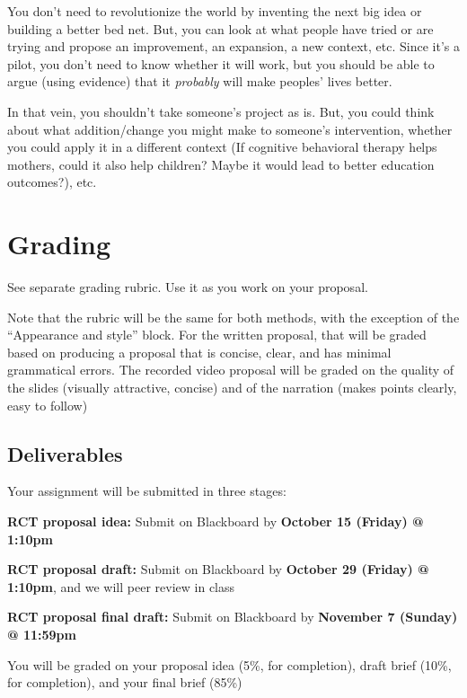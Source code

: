 \documentclass[11pt]{article}
\begin{document}
You don't need to revolutionize the world by inventing the next big idea
or building a better bed net. But, you can look at what people have
tried or are trying and propose an improvement, an expansion, a new
context, etc. Since it's a pilot, you don't need to know whether it will
work, but you should be able to argue (using evidence) that it
\emph{probably} will make peoples' lives better.

In that vein, you shouldn't take someone's project as is. But, you could
think about what addition/change you might make to someone's
intervention, whether you could apply it in a different context (If
cognitive behavioral therapy helps mothers, could it also help children?
Maybe it would lead to better education outcomes?), etc.

\hypertarget{grading-2}{%
\section*{Grading}\label{grading-2}}

See separate grading rubric. Use it as you work on your proposal.

Note that the rubric will be the same for both methods, with the
exception of the ``Appearance and style'' block. For the written
proposal, that will be graded based on producing a proposal that is
concise, clear, and has minimal grammatical errors. The recorded video
proposal will be graded on the quality of the slides (visually
attractive, concise) and of the narration (makes points clearly, easy to
follow)

\hypertarget{deliverables-1}{%
\subsection*{Deliverables}\label{deliverables-1}}

Your assignment will be submitted in three stages:

\textbf{RCT proposal idea:} Submit on Blackboard by \textbf{October 15
(Friday) @ 1:10pm}

\textbf{RCT proposal draft:} Submit on Blackboard by \textbf{October 29
(Friday) @ 1:10pm}, and we will peer review in class

\textbf{RCT proposal final draft:} Submit on Blackboard by
\textbf{November 7 (Sunday) @ 11:59pm}

You will be graded on your proposal idea (5\%, for completion), draft
brief (10\%, for completion), and your final brief (85\%)
\end{document}
